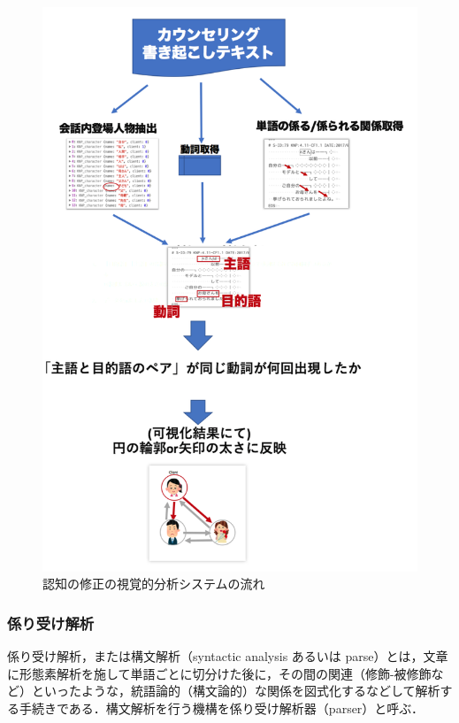 \documentclass[shuuron]{kuee}
\begin{document}
\begin{figure}
  \begin{center}
    \includegraphics[clip,width=13.0cm]{charaFlow.png}
  \end{center}
  \caption{認知の修正の視覚的分析システムの流れ}
  \label{fig:charaFlow}
\end{figure}





\subsubsection{係り受け解析}


係り受け解析，または構文解析（syntactic analysis あるいは parse）とは，文章に形態素解析を施して単語ごとに切分けた後に，その間の関連（修飾-被修飾など）といったような，統語論的（構文論的）な関係を図式化するなどして解析する手続きである．構文解析を行う機構を係り受け解析器（parser）と呼ぶ．
\end{document}
